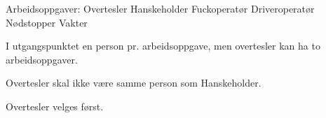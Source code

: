 Arbeidsoppgaver:
Overtesler
Hanskeholder
Fuckoperatør
Driveroperatør
Nødstopper
Vakter

I utgangspunktet en person pr. arbeidsoppgave, men overtesler kan ha to arbeidsoppgaver.

Overtesler skal ikke være samme person som Hanskeholder.

Overtesler velges først.